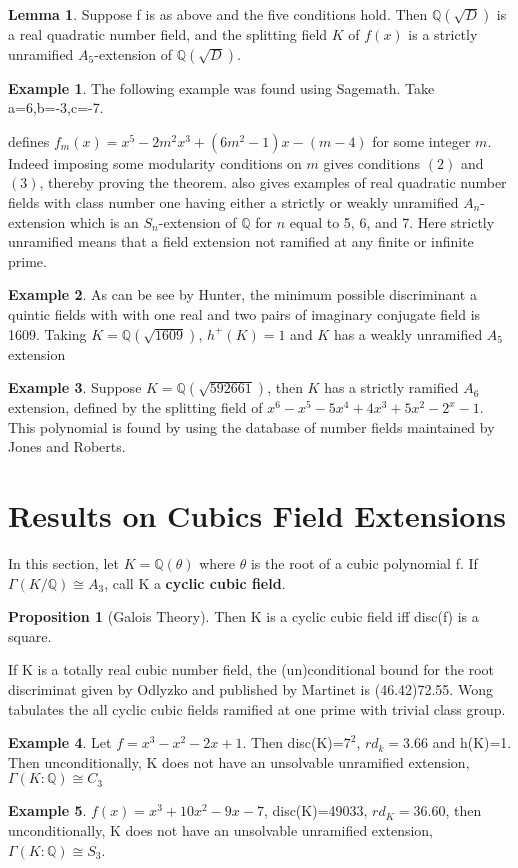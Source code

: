 \documentclass[12pt]{extarticle}
\newcommand{\Q}{\mathbb{Q}}
\newcommand{\<}{\langle}
\renewcommand{\>}{\rangle}
\theoremstyle{definition}
\newtheorem{proposition}{Proposition}
\newtheorem*{example}{Example}
\newtheorem{lemma}{Lemma}
\begin{document}
\begin{lemma}
Suppose f is as above and the five conditions hold. Then $\Q(\sqrt{D})$ is a real quadratic number field, and the splitting field $K$ of $f(x) $ is a strictly unramified $A_5$-extension of $\Q(\sqrt{D})$. 
\end{lemma}
\begin{example}
    The following example was found using Sagemath. Take a=6,b=-3,c=-7. 
\end{example}
\cite{YAMAMURA2} defines $f_m(x)= x^5-2m^2x^3+(6m^2-1)x-(m-4)$ for some integer $m$. Indeed imposing some modularity conditions on $m$ gives conditions $(2)$ and $(3)$, thereby proving the theorem. 
\cite{YAMAMURA2} also gives examples of real quadratic number fields with class number one having either a strictly or weakly unramified $A_n$-extension which is an $S_n$-extension of $\Q$ for $n$ equal to 5, 6, and 7. Here strictly unramified means that a field extension not ramified at any finite or infinite prime.
\begin{example}
As can be see by Hunter, the minimum possible discriminant a quintic fields with with one real and two pairs of imaginary conjugate field is 1609. 
Taking $K=\Q(\sqrt{1609})$, $h^{+}(K)=1$ and $K$ has a weakly unramified $A_5$ extension
\end{example}
\begin{example}
Suppose $K=\Q(\sqrt{592661})$, then $K$ has a strictly ramified $A_6$ extension, defined by the splitting field of  $x^6 - x^5 - 5x^4 + 4x^3 + 5x^2 - 2^x - 1$. This polynomial is found by using the database of number fields maintained by Jones and Roberts.
\end{example}

\section{Results on Cubics Field Extensions}
In this section, let $K=\Q(\theta)$ where $\theta$ is the root of a cubic polynomial 
f. If $\Gamma(K/\Q) \cong A_3$, call K a  \textbf{cyclic cubic field}.
\begin{proposition}[Galois Theory]
Then K is a cyclic cubic field iff disc(f) is a square. 
\end{proposition} If K is a totally real cubic number field, the (un)conditional bound for the root discriminat given by Odlyzko and published by Martinet is (46.42)72.55. Wong tabulates the all cyclic cubic fields ramified at one prime with trivial class group. 
\begin{example}
    Let $f=x^3-x^2-2x+1$. Then disc(K)=$7^2$, $rd_{k}=3.66$ and h(K)=1. Then unconditionally, K does not have an unsolvable unramified extension, $\Gamma(K:\mathbb{Q})\cong C_3$
\end{example}
\begin{example}
    $f(x)=x^3 + 10x^2 - 9x - 7$, disc(K)=49033, $rd_{K}=36.60$, then unconditionally, K does not have an unsolvable unramified extension, $\Gamma(K:\mathbb{Q})\cong S_3$.
\end{example}
\end{document}
